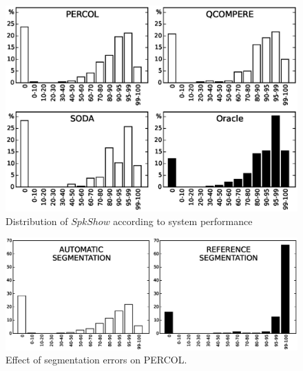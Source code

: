 \begin{figure}[t]
\centering
\includegraphics[width=\linewidth]{figures/bimodal.eps}
\caption{Distribution of $SpkShow$ according to system performance}
\label{fig:FMeasureDistribution}
\end{figure}


\begin{figure}[t]
\centering
\includegraphics[width=\linewidth]{figures/ref.eps}
\caption{Effect of segmentation errors on PERCOL.}
\label{fig:autoVSref}
\end{figure}

